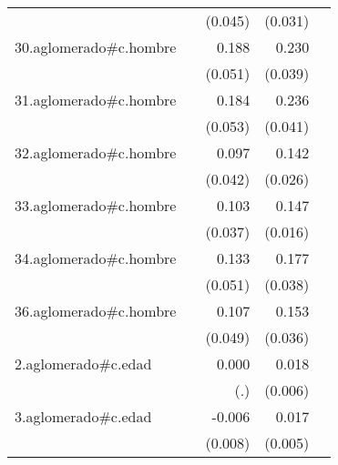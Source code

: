 {\begin{longtable}{l*{4}{D{.}{.}{-1}}}
            &                     &     (0.045)         &     (0.031)         &                     \\
\addlinespace
30.aglomerado#c.hombre&                     &       0.188\sym{***}&       0.230\sym{***}&                     \\
            &                     &     (0.051)         &     (0.039)         &                     \\
\addlinespace
31.aglomerado#c.hombre&                     &       0.184\sym{***}&       0.236\sym{***}&                     \\
            &                     &     (0.053)         &     (0.041)         &                     \\
\addlinespace
32.aglomerado#c.hombre&                     &       0.097\sym{*}  &       0.142\sym{***}&                     \\
            &                     &     (0.042)         &     (0.026)         &                     \\
\addlinespace
33.aglomerado#c.hombre&                     &       0.103\sym{**} &       0.147\sym{***}&                     \\
            &                     &     (0.037)         &     (0.016)         &                     \\
\addlinespace
34.aglomerado#c.hombre&                     &       0.133\sym{**} &       0.177\sym{***}&                     \\
            &                     &     (0.051)         &     (0.038)         &                     \\
\addlinespace
36.aglomerado#c.hombre&                     &       0.107\sym{*}  &       0.153\sym{***}&                     \\
            &                     &     (0.049)         &     (0.036)         &                     \\
\addlinespace
2.aglomerado#c.edad&                     &       0.000         &       0.018\sym{**} &                     \\
            &                     &         (.)         &     (0.006)         &                     \\
\addlinespace
3.aglomerado#c.edad&                     &      -0.006         &       0.017\sym{***}&                     \\
            &                     &     (0.008)         &     (0.005)         &                     \\

\end{longtable}}

